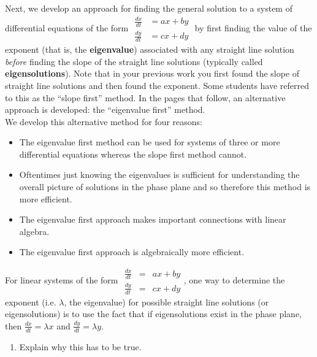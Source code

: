 Next, we develop an approach for finding the general solution to a system of differential equations of the form $ \begin{matrix} \frac{dx}{dt}&=ax+by \\\frac{dy}{dt}&= cx+dy  \end{matrix}$  by first finding the value of the exponent (that is, the \textbf{eigenvalue}) associated with any straight line solution \textit{before} finding the slope of the straight line solutions (typically called \textbf{eigensolutions}). Note that in your previous work you first found the slope of straight line solutions and then found the exponent. Some students have referred to this as the ``slope first'' method. In the pages that follow, an alternative approach is developed: the ``eigenvalue first'' method. \\ 

We develop this alternative method for four reasons:
\begin{itemize}
\item	The eigenvalue first method can be used for systems of three or more differential equations whereas the slope first method cannot.
\item	Oftentimes just knowing the eigenvalues is sufficient for understanding the overall picture of solutions in the phase plane and so therefore this method is more efficient.
\item	The eigenvalue first approach makes important connections with linear algebra.
\item	The eigenvalue first approach is algebraically more efficient.
\end{itemize}

\clearpage


For linear systems of the form  $ \begin{matrix} \frac{dx}{dt}&=&ax+by \\\frac{dy}{dt}&=& cx+dy  \end{matrix}$, one way to determine the exponent (i.e. $\lambda$, the eigenvalue) for possible straight line solutions (or eigensolutions) is to use the fact that if eigensolutions exist in the phase plane, then  $\frac{dx}{dt}=\lambda x$ and  $\frac{dy}{dt}=\lambda y$.  

\begin{enumerate}[resume]
\item	Explain why this has to be true. \label{12problem4}
\vspace{2in}
\end{enumerate}

